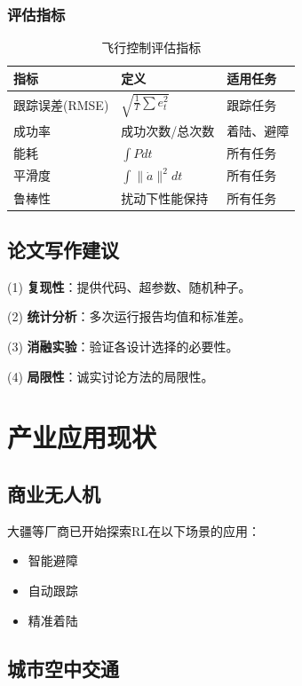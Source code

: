 \subsubsection{评估指标}

\begin{table}[htbp]
\centering
\caption{飞行控制评估指标}\label{tab:metrics}
\begin{tabular}{@{}lll@{}}
\toprule
\textbf{指标} & \textbf{定义} & \textbf{适用任务} \\
\midrule
跟踪误差(RMSE) & $\sqrt{\frac{1}{T}\sum e_t^2}$ & 跟踪任务 \\
成功率 & 成功次数/总次数 & 着陆、避障 \\
能耗 & $\int P dt$ & 所有任务 \\
平滑度 & $\int \|\dot{a}\|^2 dt$ & 所有任务 \\
鲁棒性 & 扰动下性能保持 & 所有任务 \\
\bottomrule
\end{tabular}
\end{table}

\subsection{论文写作建议}

(1) \textbf{复现性}：提供代码、超参数、随机种子。

(2) \textbf{统计分析}：多次运行报告均值和标准差。

(3) \textbf{消融实验}：验证各设计选择的必要性。

(4) \textbf{局限性}：诚实讨论方法的局限性。

\section{产业应用现状}\label{sec:industry}

\subsection{商业无人机}

大疆等厂商已开始探索RL在以下场景的应用：
\begin{itemize}
    \item 智能避障
    \item 自动跟踪
    \item 精准着陆
\end{itemize}

\subsection{城市空中交通}

